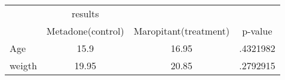 \begin{tabular}{l*{3}{c}}
\hline\hline
            &     results&            &            \\
            &Metadone(control)&Maropitant(treatment)&     p-value\\
\hline
Age         &        15.9&       16.95&    .4321982\\
weigth      &       19.95&       20.85&    .2792915\\
\hline\hline
\end{tabular}

